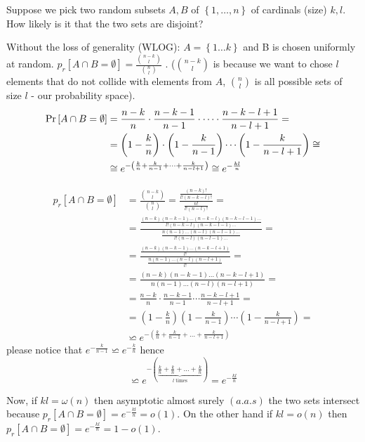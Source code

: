 \begin{example}
Suppose we pick two random subsets $A,B$ of $\left\{ 1,\dots,n\right\} $
of cardinals (size) $k,l$. How likely is it that the two sets are
disjoint? 

Without the loss of generality (WLOG): $A=\left\{ 1\dots k\right\} $
and B is chosen uniformly at random. $p_{r}\left[A\cap B=\emptyset\right]=\frac{\binom{n-k}{l}}{\binom{n}{l}}$
. ($\binom{n-k}{l}$ is because we want to chose $l$ elements that
do not collide with elements from $A$, $\binom{n}{l}$ is all possible
sets of size $l$ - our probability space). 
\begin{align*}
\Pr\left[A\cap B=\emptyset\right] & =\frac{n-k}{n}\cdot\frac{n-k-1}{n-1}\cdot\dots\cdot\frac{n-k-l+1}{n-l+1}=\\
 & =\left(1-\frac{k}{n}\right)\cdot\left(1-\frac{k}{n-1}\right)\cdots\left(1-\frac{k}{n-l+1}\right)\cong\\
 & \cong e^{-\left(\frac{k}{n}+\frac{k}{n-1}+\dots+\frac{k}{n-l+1}\right)}\cong e^{-\frac{kl}{n}}
\end{align*}
\begin{insight}
\begin{align*}
p_{r}\left[A\cap B=\emptyset\right] & =\frac{\binom{n-k}{l}}{\binom{n}{l}}=\frac{\frac{\left(n-k\right)!}{l!\left(n-k-l\right)!}}{\frac{n!}{l!\left(n-l\right)!}}=\\
 & =\frac{\frac{\left(n-k\right)\left(n-k-1\right)\dots\left(n-k-l\right)\left(n-k-l-1\right)\dots}{l!\left(n-k-l\right)\left(n-k-l-1\right)\dots}}{\frac{n\left(n-1\right)\dots\left(n-l\right)\left(n-l-1\right)\dots}{l!\left(n-l\right)\left(n-l-1\right)\dots}}=\\
 & =\frac{\frac{\left(n-k\right)\left(n-k-1\right)\dots\left(n-k-l+1\right)}{l!}}{\frac{n\left(n-1\right)\dots\left(n-l\right)\left(n-l+1\right)}{l!}}=\\
 & =\frac{\left(n-k\right)\left(n-k-1\right)\dots\left(n-k-l+1\right)}{n\left(n-1\right)\dots\left(n-l\right)\left(n-l+1\right)}=\\
 & =\frac{n-k}{n}\cdot\frac{n-k-1}{n-1}\cdots\frac{n-k-l+1}{n-l+1}=\\
 & =\left(1-\frac{k}{n}\right)\left(1-\frac{k}{n-1}\right)\cdots\left(1-\frac{k}{n-l+1}\right)=\\
 & \backsimeq e^{-\left(\frac{k}{n}+\frac{k}{n-1}+\dots+\frac{k}{n-l+1}\right)}
\end{align*}
 please notice that $e^{-\frac{k}{n-1}}\backsimeq e^{-\frac{k}{n}}$
hence 
\[
\backsimeq e^{-\left(\underbrace{\frac{k}{n}+\frac{k}{n}+\dots+\frac{k}{n}}_{l\text{ times}}\right)}=e^{-\frac{kl}{n}}
\]
\end{insight}
{} Now, if $kl=\omega\left(n\right)$ then asymptotic almost surely
$\left(a.a.s\right)$ the two sets intersect because $p_{r}\left[A\cap B=\emptyset\right]=e^{-\frac{kl}{n}}=o\left(1\right)$.
On the other hand if $kl=o\left(n\right)$ then $p_{r}\left[A\cap B=\emptyset\right]=e^{-\frac{kl}{n}}=1-o\left(1\right)$.
\end{example}


